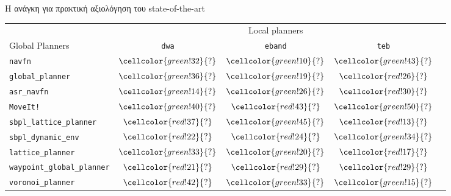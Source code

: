 \begin{frame}{Η ανάγκη για πρακτική αξιολόγηση του state-of-the-art}
{\footnotesize
\begin{table}[h]
\begin{tabular}{lcccc}
  & \multicolumn{3}{c}{Local planners} \\
  \cline{2-4}
  Global Planners                     & \texttt{dwa}                               & \texttt{eband}                             & \texttt{teb} \\ \toprule
  \texttt{navfn}                     & $\cellcolor{green!32}{?}$         & $\cellcolor{green!10}{?}$            & $\cellcolor{green!43}{?}$         \\
  \texttt{global\_planner}           & $\cellcolor{green!36}{?}$         & $\cellcolor{green!19}{?}$            & $\cellcolor{red!26}{?}$         \\
  \texttt{asr\_navfn}                & $\cellcolor{green!14}{?}$         & $\cellcolor{green!26}{?}$            & $\cellcolor{red!30}{?}$         \\
  \texttt{MoveIt!}                   & $\cellcolor{green!40}{?}$         & $\cellcolor{red!43}{?}$            & $\cellcolor{green!50}{?}$         \\
  \texttt{sbpl\_lattice\_planner}    & $\cellcolor{red!37}{?}$         & $\cellcolor{green!45}{?}$            & $\cellcolor{red!13}{?}$         \\
  \texttt{sbpl\_dynamic\_env}        & $\cellcolor{red!22}{?}$         & $\cellcolor{red!24}{?}$            & $\cellcolor{green!34}{?}$         \\
  \texttt{lattice\_planner}          & $\cellcolor{green!33}{?}$         & $\cellcolor{green!20}{?}$            & $\cellcolor{red!17}{?}$         \\
  \texttt{waypoint\_global\_planner} & $\cellcolor{red!21}{?}$         & $\cellcolor{red!29}{?}$            & $\cellcolor{red!29}{?}$         \\
  \texttt{voronoi\_planner}          & $\cellcolor{red!42}{?}$         & $\cellcolor{green!33}{?}$            & $\cellcolor{green!15}{?}$         \\ \bottomrule
\end{tabular}
\end{table}
}

\end{frame}

